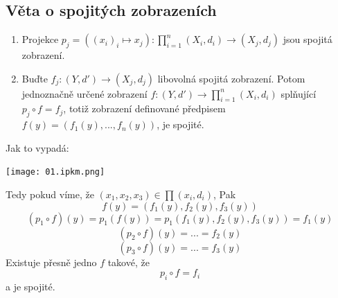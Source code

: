 \documentclass[../main.tex]{subfiles}
\begin{document}
\subsection{Věta o spojitých zobrazeních}
\begin{theorem}
	\hfill
	\begin{enumerate}
	\item Projekce $p_j = ((x_i)_i \mapsto x_j) : \prod^n_{i=1}(X_i,d_i) \rightarrow (X_j,d_j)$ jsou spojitá zobrazení.
	
	\item Buďte $f_j:(Y,d') \rightarrow (X_j,d_j)$ libovolná spojitá zobrazení. Potom jednoznačně určené zobrazení 
	$f:(Y,d') \rightarrow \prod^n_{i=1}(X_i,d_i)$ splňující $p_j \circ f = f_j$, totiž zobrazení definované předpisem
	$f(y) = (f_1(y),...,f_n(y))$, je spojité.
	\end{enumerate}
\end{theorem}

\begin{intuition}
	Jak to vypadá:
	\begin{center}
	\texttt{[image: 01.ipkm.png]}
	\end{center}
	Tedy pokud víme, že $(x_1,x_2,x_3)\in \prod (x_i,d_i)$, Pak
	\[f(y) = (f_1(y),f_2(y),f_3(y))\]
	\[(p_1\circ f)(y) = p_1(f(y)) = p_1(f_1(y),f_2(y),f_3(y))=f_1(y)\]
	\[(p_2\circ f)(y) = ... = f_2(y)\]
	\[(p_3\circ f)(y) = ... = f_3(y)\]
	Existuje přesně jedno $f$ takové, že 
	\[p_i \circ f = f_i\]
	a je spojité.
\end{intuition}
\end{document}
